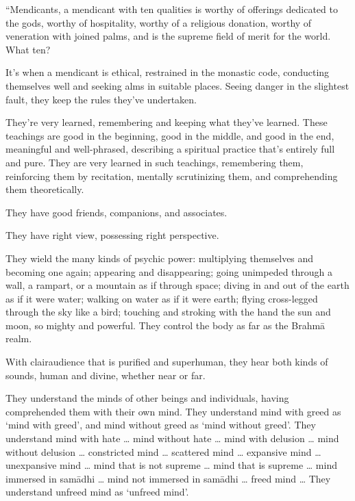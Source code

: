 \documentclass[12pt,openany]{book}%
\begin{document}
“Mendicants, a mendicant with ten qualities is worthy of offerings dedicated to the gods, worthy of hospitality, worthy of a religious donation, worthy of veneration with joined palms, and is the supreme field of merit for the world. What ten? 

It’s when a mendicant is ethical, restrained in the monastic code, conducting themselves well and seeking alms in suitable places. Seeing danger in the slightest fault, they keep the rules they’ve undertaken. 

They’re very learned, remembering and keeping what they’ve learned. These teachings are good in the beginning, good in the middle, and good in the end, meaningful and well-phrased, describing a spiritual practice that’s entirely full and pure. They are very learned in such teachings, remembering them, reinforcing them by recitation, mentally scrutinizing them, and comprehending them theoretically. 

They have good friends, companions, and associates. 

They have right view, possessing right perspective. 

They wield the many kinds of psychic power: multiplying themselves and becoming one again; appearing and disappearing; going unimpeded through a wall, a rampart, or a mountain as if through space; diving in and out of the earth as if it were water; walking on water as if it were earth; flying cross-legged through the sky like a bird; touching and stroking with the hand the sun and moon, so mighty and powerful. They control the body as far as the \textsanskrit{Brahmā} realm. 

With clairaudience that is purified and superhuman, they hear both kinds of sounds, human and divine, whether near or far. 

They understand the minds of other beings and individuals, having comprehended them with their own mind. They understand mind with greed as ‘mind with greed’, and mind without greed as ‘mind without greed’. They understand mind with hate … mind without hate … mind with delusion … mind without delusion … constricted mind … scattered mind … expansive mind … unexpansive mind … mind that is not supreme … mind that is supreme … mind immersed in \textsanskrit{samādhi} … mind not immersed in \textsanskrit{samādhi} … freed mind … They understand unfreed mind as ‘unfreed mind’. 
\end{document}
